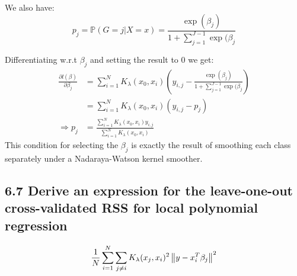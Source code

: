 We also have:
$$p_j = \mathbb{P}(G = j \vert X = x) = \frac{\exp(\beta_j)}{1+\sum_{j=1}^{J-1} \exp(\beta_j}$$

Differentiating w.r.t $\beta_j$ and setting the result to $0$ we get:
\begin{align*}
   \frac{\partial l(\beta)}{\partial \beta_j} &= \sum_{i=1}^N K_\lambda(x_0, x_i) \left(y_{i,j} - \frac{\exp(\beta_j)}{1+\sum_{j=1}^{J-1} \exp(\beta_j}\right) \\
   &= \sum_{i=1}^N K_\lambda(x_0, x_i) \left(y_{i,j} - p_j\right) \\
   \Rightarrow p_j &= \frac{ \sum_{i=1}^N K_\lambda(x_0, x_i) y_{i,j} } {\sum_{i=1}^N K_\lambda(x_0, x_i) }
\end{align*} 
This condition for selecting the $\beta_j$ is exactly the result of smoothing each class separately under a Nadaraya-Watson kernel smoother.

\subsection*{6.7 Derive an expression for the leave-one-out cross-validated RSS for local polynomial regression}

$$\frac{1}{N} \sum_{i=1}^N \sum_{j \neq i} K_\lambda(x_j, x_i)^2 \left\lVert y-x_i^T\beta_j\right\rVert^2$$